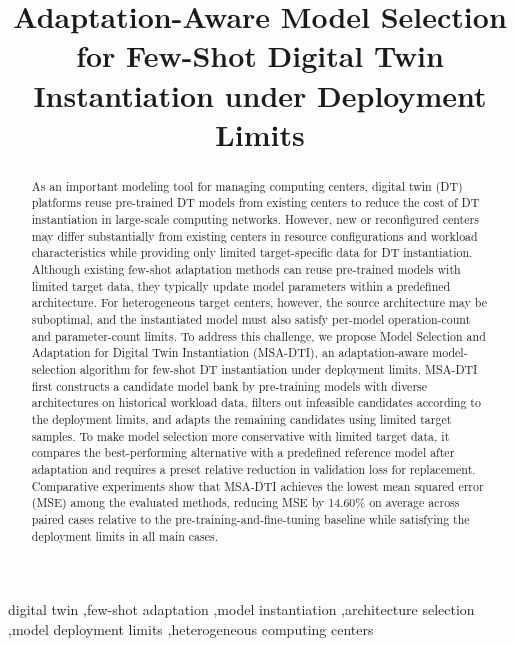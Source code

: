 \documentclass[a4paper,fleqn]{cas-sc}
\begin{document}
\setlength{\abovedisplayskip}{0pt plus 1pt minus 0pt}
\setlength{\belowdisplayskip}{5pt plus 1pt minus 1pt}
\setlength{\abovedisplayshortskip}{0pt plus 1pt minus 0pt}
\setlength{\belowdisplayshortskip}{5pt plus 1pt minus 1pt}


\title[mode=title]{Adaptation-Aware Model Selection for Few-Shot Digital Twin Instantiation under Deployment Limits}

\begin{abstract}
As an important modeling tool for managing computing centers, digital twin
(DT) platforms reuse pre-trained DT models from existing centers to reduce the
cost of DT instantiation in large-scale computing networks. However, new or
reconfigured centers may differ substantially from existing centers in resource
configurations and workload characteristics while providing only limited
target-specific data for DT instantiation. Although existing few-shot
adaptation methods can reuse pre-trained models with limited target data, they
typically update model parameters within a predefined architecture. For
heterogeneous target centers, however, the source architecture may be
suboptimal, and the instantiated model must also satisfy per-model
operation-count and parameter-count limits. To address this challenge, we
propose Model Selection and Adaptation for Digital Twin Instantiation
(MSA-DTI), an adaptation-aware model-selection algorithm for few-shot DT
instantiation under deployment limits. MSA-DTI first constructs a candidate
model bank by pre-training models with diverse architectures on historical
workload data, filters out infeasible candidates according to the deployment
limits, and adapts the remaining candidates using limited target samples. To
make model selection more conservative with limited target data, it compares
the best-performing alternative with a predefined reference model after
adaptation and requires a preset relative reduction in validation loss for
replacement. Comparative experiments show that MSA-DTI achieves the lowest
mean squared error (MSE) among the evaluated methods, reducing MSE by 14.60\%
on average across paired cases relative to the pre-training-and-fine-tuning
baseline while satisfying the deployment limits in all main cases.
\end{abstract}

\begin{keywords}
digital twin
\sep few-shot adaptation
\sep model instantiation
\sep architecture selection
\sep model deployment limits
\sep heterogeneous computing centers
\end{keywords}
\end{document}
